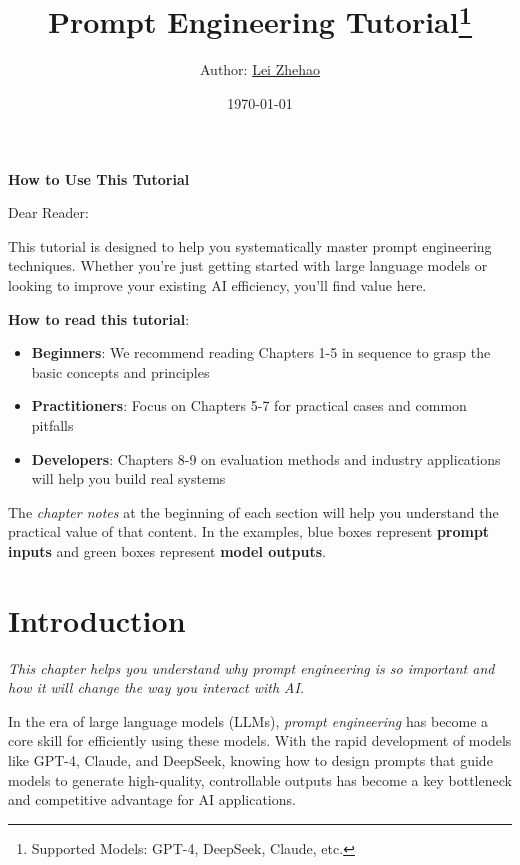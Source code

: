 \documentclass[12pt]{article}
\title{Prompt Engineering Tutorial\thanks{Supported Models: GPT-4, DeepSeek, Claude, etc.}}
\author{Author: \href{mailto:ray12303@163.com}{Lei Zhehao}}
\date{\today}
\newcommand{\chapternote}[1]{\vspace{-0.3cm}\par\noindent\textit{\small #1}\vspace{0.3cm}}
\begin{document}
\maketitle

\begin{center}
\large\textbf{How to Use This Tutorial}
\end{center}

\noindent Dear Reader:

This tutorial is designed to help you systematically master prompt engineering techniques. Whether you're just getting started with large language models or looking to improve your existing AI efficiency, you'll find value here.

\textbf{How to read this tutorial}:
\begin{itemize}
  \item \textbf{Beginners}: We recommend reading Chapters 1-5 in sequence to grasp the basic concepts and principles
  \item \textbf{Practitioners}: Focus on Chapters 5-7 for practical cases and common pitfalls
  \item \textbf{Developers}: Chapters 8-9 on evaluation methods and industry applications will help you build real systems
\end{itemize}

The \textit{chapter notes} at the beginning of each section will help you understand the practical value of that content. In the examples, blue boxes represent \textbf{prompt inputs} and green boxes represent \textbf{model outputs}.

\tableofcontents
\newpage

\section{Introduction}
\chapternote{This chapter helps you understand why prompt engineering is so important and how it will change the way you interact with AI.}

In the era of large language models (LLMs), \emph{prompt engineering} has become a core skill for efficiently using these models. With the rapid development of models like GPT-4, Claude, and DeepSeek, knowing how to design prompts that guide models to generate high-quality, controllable outputs has become a key bottleneck and competitive advantage for AI applications.
\end{document}
